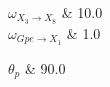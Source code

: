 
$\omega_{X_3 \rightarrow X_8}$ & 10.0 \\ \hline
$\omega_{Gpe \rightarrow X_1}$ & 1.0 \\ \hline

$\theta_{p}$ & 90.0 \\ \hline
